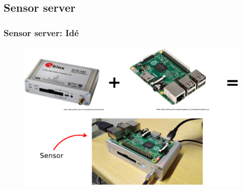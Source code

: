 \documentclass[xcolor=table]{beamer}
\begin{document}
\subsection{Sensor server}
\begin{frame}
  \frametitle{Sensor server: Idé}
    \begin{figure}
      \includegraphics[scale=0.2]{thesis/graphics/raspi_gps.pdf}
    \end{figure}
\end{frame}
\end{document}
